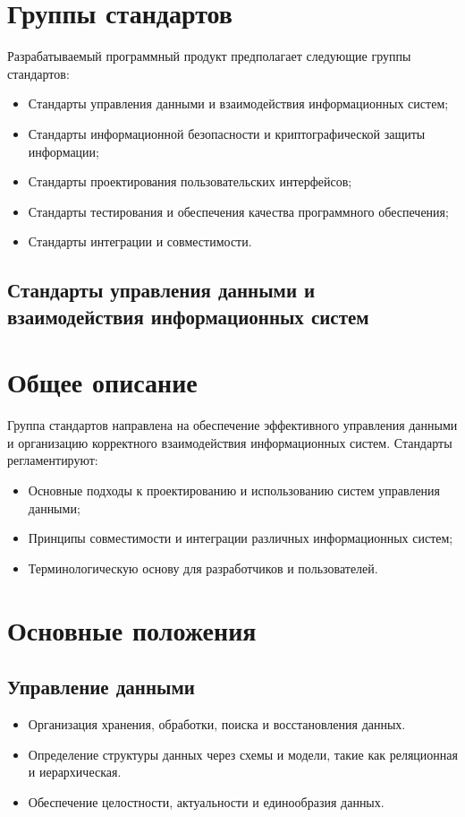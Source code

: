 \section{Группы стандартов}

Разрабатываемый программный продукт предполагает следующие группы стандартов:

\begin{itemize}
    \item Стандарты управления данными и взаимодействия информационных систем;
    \item Стандарты информационной безопасности и криптографической защиты информации;
    \item Стандарты проектирования пользовательских интерфейсов;
    \item Стандарты тестирования и обеспечения качества программного обеспечения;
    \item Стандарты интеграции и совместимости.
\end{itemize}

\subsection{Стандарты управления данными и взаимодействия информационных систем}

\section*{Общее описание}
Группа стандартов направлена на обеспечение эффективного управления данными и организацию корректного взаимодействия информационных систем. Стандарты регламентируют:
\begin{itemize}
    \item Основные подходы к проектированию и использованию систем управления данными;
    \item Принципы совместимости и интеграции различных информационных систем;
    \item Терминологическую основу для разработчиков и пользователей.
\end{itemize}

\section*{Основные положения}
\subsection*{Управление данными}
\begin{itemize}
    \item Организация хранения, обработки, поиска и восстановления данных.
    \item Определение структуры данных через схемы и модели, такие как реляционная и иерархическая.
    \item Обеспечение целостности, актуальности и единообразия данных.
\end{itemize}

